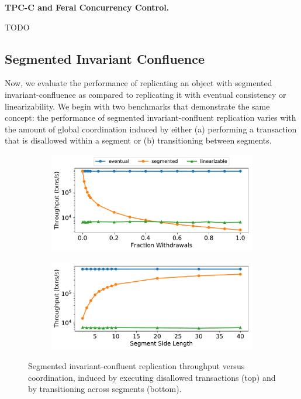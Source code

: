 \textbf{TPC-C and Feral Concurrency Control.}

TODO

\subsection{Segmented Invariant Confluence}%
Now, we evaluate the performance of replicating an object with segmented
invariant-confluence as compared to replicating it with eventual consistency or
linearizability. We begin with two benchmarks that demonstrate the same
concept: the performance of segmented invariant-confluent replication varies
with the amount of global coordination induced by either (a) performing a
transaction that is disallowed within a segment or (b) transitioning between
segments.

\begin{figure}[ht]
  \centering

  \begin{subfigure}[c]{\columnwidth}
    \centering
    \includegraphics[width=\columnwidth]{figures/vary_withdraws.pdf}
  \end{subfigure}
  \begin{subfigure}[c]{\columnwidth}
    \includegraphics[width=\columnwidth]{figures/vary_segments.pdf}
  \end{subfigure}

  \caption{%
    Segmented invariant-confluent replication throughput versus coordination,
    induced by executing disallowed transactions (top) and by transitioning
    across segments (bottom).
  }
\end{figure}

